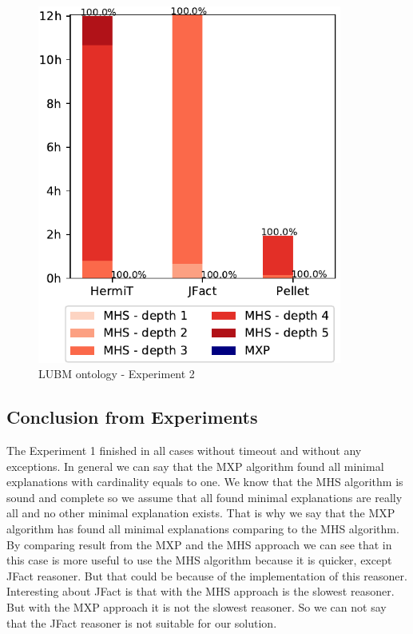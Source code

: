 \documentclass[12pt,a4paper]{article}
\begin{document}
\begin{figure}[H]
	\centering
	\includegraphics[width=10cm]{eval2LUBM} 
	\caption{LUBM ontology - Experiment 2}
	\label{fig:eval2LUBM}
\end{figure}

\subsection{Conclusion from Experiments}
The Experiment 1 finished in all cases without timeout and without any exceptions. In general we can say that the MXP algorithm found all minimal explanations with cardinality equals to one. We know that the MHS algorithm is sound and complete so we assume that all found minimal explanations are really all and no other minimal explanation exists. That is why we say that the MXP algorithm has found all minimal explanations comparing to the MHS algorithm. By comparing result from the MXP and the MHS approach we can see that in this case is more useful to use the MHS algorithm because it is quicker, except JFact reasoner. But that could be because of the implementation of this reasoner. Interesting about JFact is that with the MHS approach is the slowest reasoner. But with the MXP approach it is not the slowest reasoner. So we can not say that the JFact reasoner is not suitable for our solution.
\end{document}
